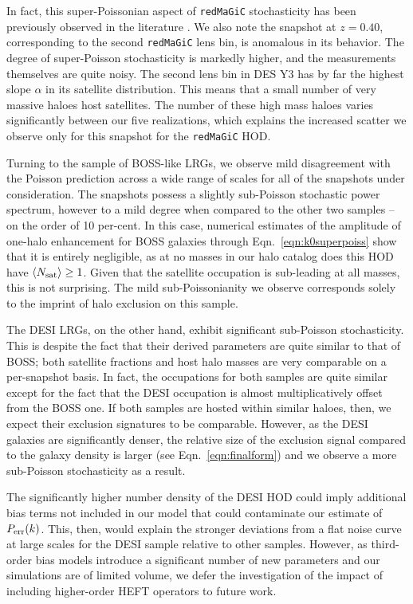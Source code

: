 \documentclass[fleqn,usenatbib]{mnras}
\newcommand{\redmagic}{\texttt{redMaGiC} }
\begin{document}
In fact, this super-Poissonian aspect of \redmagic stochasticity has been previously observed in the literature \citep{Friedrich_2018, Gruen_2018, friedrich2021pdf}. We also note the snapshot at $z=0.40$, corresponding to the second \redmagic lens bin, is anomalous in its behavior. The degree of super-Poisson stochasticity is markedly higher, and the measurements themselves are quite noisy. The second lens bin in DES Y3 has by far the highest slope $\alpha$ in its satellite distribution. This means that a small number of very massive haloes host satellites. The number of these high mass haloes varies significantly between our five realizations, which  explains the increased scatter we observe only for this snapshot for the \redmagic HOD.\par 
Turning to the sample of BOSS-like LRGs, we observe mild disagreement with the Poisson prediction across a wide range of scales for all of the snapshots under consideration. The snapshots possess a slightly sub-Poisson stochastic power spectrum, however to a mild degree when compared to the other two samples -- on the order of 10 per-cent. In this case, numerical estimates of the amplitude of one-halo enhancement for BOSS galaxies through Eqn.~\ref{eqn:k0superpoiss} show that it is entirely negligible, as at no masses in our halo catalog does this HOD have $\langle N_{\rm sat} \rangle \geq 1$. Given that the satellite occupation is sub-leading at all masses, this is not surprising. The mild sub-Poissonianity we observe corresponds solely to the imprint of halo exclusion on this sample. \par 
The DESI LRGs, on the other hand, exhibit significant sub-Poisson stochasticity. This is despite the fact that their derived parameters are quite similar to that of BOSS; both satellite fractions and host halo masses are very comparable on a per-snapshot basis. In fact, the occupations for both samples are quite similar except for the fact that the DESI occupation is almost multiplicatively offset from the BOSS one. If both samples are hosted within similar haloes, then, we expect their exclusion signatures to be comparable. However, as the DESI galaxies are significantly denser, the relative size of the exclusion signal compared to the galaxy density is larger (see Eqn.~\ref{eqn:finalform}) and we observe a more sub-Poisson stochasticity as a result. \par 
The significantly higher number density of the DESI HOD could imply additional bias terms not included in our model that could contaminate our estimate of $P_{\rm err}(k)$. This, then, would explain the stronger deviations from a flat noise curve at large scales for the DESI sample relative to other samples.  However, as third-order bias models introduce a significant number of new parameters and our simulations are of limited volume, we defer the investigation of the impact of including higher-order HEFT operators to future work. \par 
\end{document}
